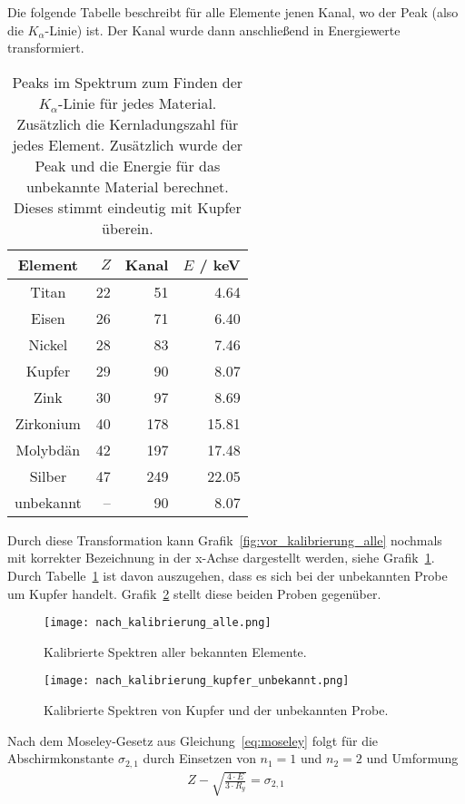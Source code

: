 \documentclass{article}
\begin{document}
Die folgende Tabelle beschreibt für alle Elemente jenen Kanal, wo der Peak (also die $K_\alpha$-Linie) ist. Der Kanal wurde dann anschließend in Energiewerte transformiert.

\begin{table}[H]
\caption{Peaks im Spektrum zum Finden der $K_\alpha$-Linie für jedes Material. Zusätzlich die Kernladungszahl für jedes Element. Zusätzlich wurde der Peak und die Energie für das unbekannte Material berechnet. Dieses stimmt eindeutig mit Kupfer überein.}
\label{tab:Energie}
\begin{tabular}{c|rrr}
Element & $Z$ & Kanal & $E$ / keV \\
\hline
Titan     & 22 &  51 &   4.64 \\
Eisen     & 26 &  71 &   6.40 \\
Nickel    & 28 &  83 &   7.46 \\
Kupfer    & 29 &  90 &   8.07 \\
Zink      & 30 &  97 &   8.69 \\
Zirkonium & 40 & 178 &  15.81 \\
Molybdän  & 42 & 197 &  17.48 \\
Silber    & 47 & 249 &  22.05 \\
\hline
unbekannt & -- & 90  &   8.07
\end{tabular}
\end{table}

Durch diese Transformation kann Grafik~\ref{fig:vor_kalibrierung_alle} nochmals mit korrekter Bezeichnung in der x-Achse dargestellt werden, siehe Grafik~\ref{fig:nach_kalibrierung_alle}. Durch Tabelle~\ref{tab:Energie} ist davon auszugehen, dass es sich bei der unbekannten Probe um Kupfer handelt. Grafik~\ref{fig:nach_kalibrierung_kupfer_unbekannt} stellt diese beiden Proben gegenüber.

\newpage

\begin{figure}[H]
\texttt{[image: nach\_kalibrierung\_alle.png]}
\caption{Kalibrierte Spektren aller bekannten Elemente.}
\label{fig:nach_kalibrierung_alle}
\end{figure}
\begin{figure}[H]
\texttt{[image: nach\_kalibrierung\_kupfer\_unbekannt.png]}
\caption{Kalibrierte Spektren von Kupfer und der unbekannten Probe.}
\label{fig:nach_kalibrierung_kupfer_unbekannt}
\end{figure}

Nach dem Moseley-Gesetz aus Gleichung~\ref{eq:moseley} folgt für die Abschirmkonstante $\sigma_{2,1}$ durch Einsetzen von $n_1=1$ und $n_2=2$ und Umformung
\begin{align*}
Z - \sqrt{\frac{4\cdot E}{3\cdot R_y}} = \sigma_{2,1}
\end{align*}
\end{document}
